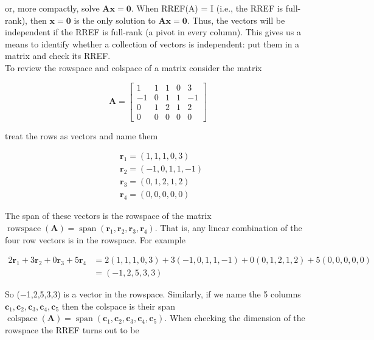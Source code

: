\documentclass[main.tex]{subfiles}
\begin{document}
    or, more compactly, solve $\mathbf{A x}=\mathbf{0}$. When RREF(A) = I (i.e., the RREF is full-rank), then $\mathbf{x}=\mathbf{0}$ is the only solution to $\mathbf{A x}=\mathbf{0}$. Thus, the vectors will be independent if the RREF is full-rank (a pivot in every column). This gives us a means to identify whether a collection of vectors is independent: put them in a matrix and check its RREF.\\
    
    To review the rowspace and colspace of a matrix consider the matrix
    
    $$
    \mathbf{A}=\left[\begin{array}{ccccc}
    1 & 1 & 1 & 0 & 3 \\
    -1 & 0 & 1 & 1 & -1 \\
    0 & 1 & 2 & 1 & 2 \\
    0 & 0 & 0 & 0 & 0
    \end{array}\right]
    $$
    
    treat the rows as vectors and name them
    
    $$
    \begin{aligned}
    &\mathbf{r}_{1}=(1,1,1,0,3) \\
    &\mathbf{r}_{2}=(-1,0,1,1,-1) \\
    &\mathbf{r}_{3}=(0,1,2,1,2) \\
    &\mathbf{r}_{4}=(0,0,0,0,0)
    \end{aligned}
    $$
    
    The span of these vectors is the rowspace of the matrix $\operatorname{rowspace}(\mathbf{A})=\operatorname{span}\left(\mathbf{r}_{1}, \mathbf{r}_{2}, \mathbf{r}_{3}, \mathbf{r}_{4}\right)$. That is, any linear combination of the four row vectors is in the rowspace. For example 
    
    $$
    \begin{aligned}
    2 \mathbf{r}_{1}+3 \mathbf{r}_{2}+0 \mathbf{r}_{3}+5 \mathbf{r}_{4} &=2(1,1,1,0,3)+3(-1,0,1,1,-1)+0(0,1,2,1,2)+5(0,0,0,0,0) \\
    &=(-1,2,5,3,3)
    \end{aligned}
    $$
    
    So (−1,2,5,3,3) is a vector in the rowspace. Similarly, if we name the 5 columns $\mathbf{c}_{1}, \mathbf{c}_{2}, \mathbf{c}_{3}, \mathbf{c}_{4}, \mathbf{c}_{5}$ then the colspace is their span $\operatorname{colspace}(\mathbf{A})=\operatorname{span}\left(\mathbf{c}_{1}, \mathbf{c}_{2}, \mathbf{c}_{3}, \mathbf{c}_{4}, \mathbf{c}_{5}\right)$. When checking the dimension of the rowspace the RREF turns out to be
    
\end{document}
